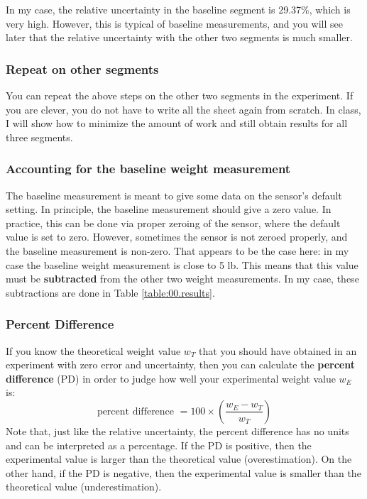 In my case, the relative uncertainty in the baseline segment is 29.37\%, which is very high. However, this is typical of baseline measurements, and you will see later that the relative uncertainty with the other two segments is much smaller.
%
\subsubsection{Repeat on other segments}
%
You can repeat the above steps on the other two segments in the experiment. If you are clever, you do not have to write all the sheet again from scratch. In class, I will show how to minimize the amount of work and still obtain results for all three segments.
%
\subsubsection{Accounting for the baseline weight measurement}
%
The baseline measurement is meant to give some data on the sensor's default setting. In principle, the baseline measurement should give a zero value. In practice, this can be done via proper zeroing of the sensor, where the default value is set to zero. However, sometimes the sensor is not zeroed properly, and the baseline measurement is non-zero. That appears to be the case here: in my case the baseline weight measurement is close to 5 lb. This means that this value must be \textbf{subtracted} from the other two weight measurements. In my case, these subtractions are done in Table \ref{table:00.results}.
%
\subsubsection{Percent Difference}
%
If you know the theoretical weight value $w_{T}$ that you should have obtained in an experiment with zero error and uncertainty, then you can calculate the \textbf{percent difference} (PD) in order to judge how well your experimental weight value $w_{E}$ is:
\begin{equation}
    \text{percent difference } = 100 \times \left( \frac{w_{E} - w_{T}}{w_{T}} \right)
    \label{eq:00.percent.diff}
\end{equation}
Note that, just like the relative uncertainty, the percent difference has no units and can be interpreted as a percentage. If the PD is positive, then the experimental value is larger than the theoretical value (overestimation). On the other hand, if the PD is negative, then the experimental value is smaller than the theoretical value (underestimation).

